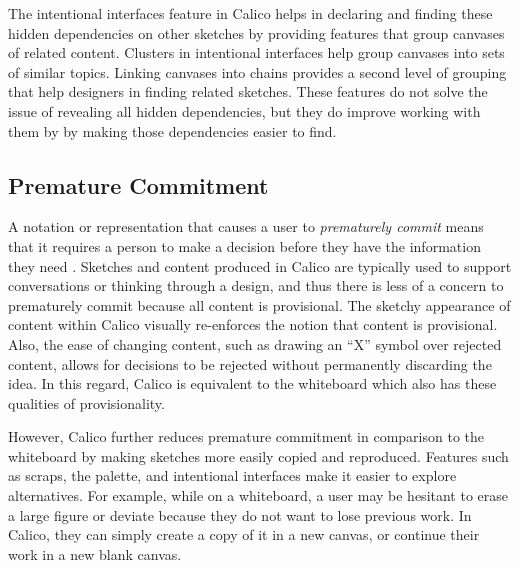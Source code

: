 \documentclass[12pt,fleqn]{ucithesis}
\begin{document}
The intentional interfaces feature in Calico helps in declaring and finding these hidden dependencies on other sketches by providing features that group canvases of related content. Clusters in intentional interfaces help group canvases into sets of similar topics. Linking canvases into chains provides a second level of grouping that help designers in finding related sketches. These features do not solve the issue of revealing all hidden dependencies, but they do improve working with them by by making those dependencies easier to find.

\subsection{Premature Commitment}
A notation or representation that causes a user to \textit{prematurely commit} means that it requires a person to make a decision before they have the information they need \cite{Petre2013BookChapter}. Sketches and content produced in Calico are typically used to support conversations or thinking through a design, and thus there is less of a concern to prematurely commit because all content is provisional. The sketchy appearance of content within Calico visually re-enforces the notion that content is provisional. Also, the ease of changing content, such as drawing an ``X'' symbol over rejected content, allows for decisions to be rejected without permanently discarding the idea. In this regard, Calico is equivalent to the whiteboard which also has these qualities of provisionality. 

However, Calico further reduces premature commitment in comparison to the whiteboard by making sketches more easily copied and reproduced. Features such as scraps, the palette, and intentional interfaces make it easier to explore alternatives. For example, while on a whiteboard, a user may be hesitant to erase a large figure or deviate because they do not want to lose previous work. In Calico, they can simply create a copy of it in a new canvas, or continue their work in a new blank canvas.

\end{document}
